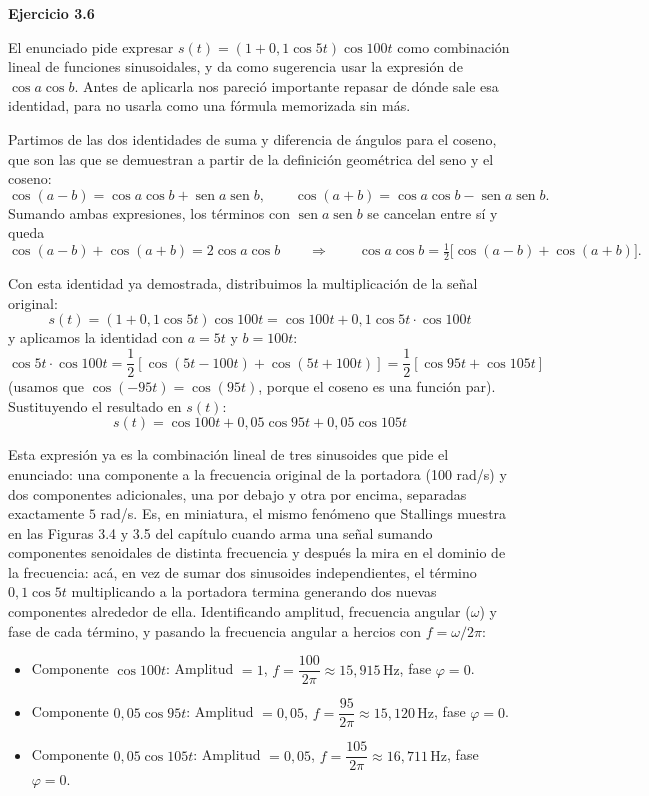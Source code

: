 \documentclass[11pt,a4paper]{article}
\newcommand{\sen}{\operatorname{sen}}
\begin{document}
\vspace{0.3cm}
\noindent\textbf{Ejercicio 3.6}\par

El enunciado pide expresar $s(t) = (1 + 0{,}1\cos 5t)\cos 100t$ como combinación lineal de funciones sinusoidales, y da como sugerencia usar la expresión de $\cos a \cos b$. Antes de aplicarla nos pareció importante repasar de dónde sale esa identidad, para no usarla como una fórmula memorizada sin más.

Partimos de las dos identidades de suma y diferencia de ángulos para el coseno, que son las que se demuestran a partir de la definición geométrica del seno y el coseno:
\[
  \cos(a-b) = \cos a\cos b + \sen a\sen b, \qquad
  \cos(a+b) = \cos a\cos b - \sen a\sen b.
\]
Sumando ambas expresiones, los términos con $\sen a \sen b$ se cancelan entre sí y queda
\[
  \cos(a-b) + \cos(a+b) = 2\cos a\cos b
  \qquad \Longrightarrow \qquad
  \cos a\cos b = \tfrac{1}{2}\big[\cos(a-b)+\cos(a+b)\big].
\]

Con esta identidad ya demostrada, distribuimos la multiplicación de la señal original:
\[
  s(t) = (1 + 0{,}1\cos 5t)\cos 100t = \cos 100t + 0{,}1\cos 5t \cdot \cos 100t
\]
y aplicamos la identidad con $a = 5t$ y $b = 100t$:
\[
  \cos 5t \cdot \cos 100t = \frac{1}{2}\left[\cos(5t-100t) + \cos(5t+100t)\right] = \frac{1}{2}\left[\cos 95t + \cos 105t\right]
\]
(usamos que $\cos(-95t)=\cos(95t)$, porque el coseno es una función par). Sustituyendo el resultado en $s(t)$:
\[
  s(t) = \cos 100t + 0{,}05\cos 95t + 0{,}05\cos 105t
\]

Esta expresión ya es la combinación lineal de tres sinusoides que pide el enunciado: una componente a la frecuencia original de la portadora (100 rad/s) y dos componentes adicionales, una por debajo y otra por encima, separadas exactamente $5$ rad/s. Es, en miniatura, el mismo fenómeno que Stallings muestra en las Figuras 3.4 y 3.5 del capítulo cuando arma una señal sumando componentes senoidales de distinta frecuencia y después la mira en el dominio de la frecuencia: acá, en vez de sumar dos sinusoides independientes, el término $0{,}1\cos 5t$ multiplicando a la portadora termina generando dos nuevas componentes alrededor de ella. Identificando amplitud, frecuencia angular ($\omega$) y fase de cada término, y pasando la frecuencia angular a hercios con $f=\omega/2\pi$:

\begin{itemize}
  \item Componente $\cos 100t$: Amplitud $= 1$, $f = \dfrac{100}{2\pi} \approx 15{,}915\,\mathrm{Hz}$, fase $\varphi = 0$.
  \item Componente $0{,}05\cos 95t$: Amplitud $= 0{,}05$, $f = \dfrac{95}{2\pi} \approx 15{,}120\,\mathrm{Hz}$, fase $\varphi = 0$.
  \item Componente $0{,}05\cos 105t$: Amplitud $= 0{,}05$, $f = \dfrac{105}{2\pi} \approx 16{,}711\,\mathrm{Hz}$, fase $\varphi = 0$.
\end{itemize}
\end{document}
